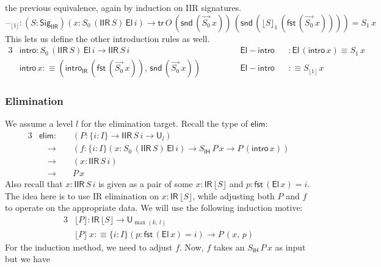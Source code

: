\documentclass[acmsmall,screen,review,anonymous]{acmart}
\newcommand{\msf}[1]{{\mathsf{#1}}}
\newcommand{\U}{\msf{U}}
\newcommand{\El}{\msf{El}}
\newcommand{\Sig}{\msf{Sig}}
\newcommand{\blank}{{\mathord{\hspace{1pt}\text{--}\hspace{1pt}}}}
\newcommand{\IR}{\msf{IR}}
\newcommand{\ih}{{ih}}
\newcommand{\intro}{\msf{intro}}
\newcommand{\IH}{\msf{IH}}
\newcommand{\elim}{\msf{elim}}
\newcommand{\tr}{\msf{tr}}
\newcommand{\fst}{\msf{fst}}
\newcommand{\snd}{\msf{snd}}
\newcommand{\IIR}{\msf{IIR}}
\newcommand{\Sigr}[1]{\lfloor #1 \rfloor}
\newcommand{\floord}[1]{\lfloor #1 \rfloor}
\newcommand{\ora}[1]{\overrightarrow{#1}}
\newcommand{\ola}[1]{\overleftarrow{#1}}
\begin{document}
the previous equivalence, again by induction on IIR signatures.
\[\blank_{\floord{1}} : (S : \Sig_\IIR)(x : S_0\,(\IIR\,S)\,\El\,i) \to \tr\,O\,(\snd\,(\ora{S_0}\,x))\,(\snd\,(\floord{S}_1\,(\fst\,(\ora{S_0}\,x)))) = S_1\,x\]
This lets us define the other introduction rules as well.
\begin{alignat*}{3}
  &\intro    : S_0\,(\IIR\,S)\,\El\,i \to \IIR\,S\,i && \msf{El\!\!-\!\!intro} && : \El\,(\intro\,x) \equiv S_1\,x \\
  &\intro\,x :\equiv (\intro_\IR\,(\fst\,(\ora{S_0}\,x)),\,\snd\,(\ora{S_0}\,x)) \quad\quad\quad&& \msf{El\!\!-\!\!intro} && :\equiv S_{\floord{1}}\,x
\end{alignat*}

\subsubsection{Elimination}

We assume a level $l$ for the elimination target. Recall the type of $\elim$:
\begin{alignat*}{3}
  &\elim :\,           &&(P : \{i : I\}\to \IIR\,S\,i \to \U_l)\\
  &                \quad\to && (f : \{i : I\}(x : S_0\,(\IIR\,S)\,\El\,i) \to S_\IH\,P\,x \to P\,(\intro\,x))\\
  &                \quad\to && (x : \IIR\,S\,i)\\
  &                \quad\to && P\,x
\end{alignat*}
Also recall that $x : \IIR\,S\,i$ is given as a pair of some $x : \IR\,\Sigr{S}$ and $p : \fst\,(\El\,x) = i$.
The idea here is to use IR elimination on $x : \IR\,\floord{S}$, while adjusting both $P$ and $f$ to operate
on the appropriate data. We will use the following induction motive:
\begin{alignat*}{3}
  &\floord{P} : \IR\,\floord{S} \to \U_{\max(k,\,l)} \\
  &\floord{P}\,x :\equiv \{i : I\}(p : \fst\,(\El\,x) = i) \to P\,(x,\,p)
\end{alignat*}
For the induction method, we need to adjust $f$. Now, $f$ takes an $S_\IH\,P\,x$ as input but we have



\end{document}
